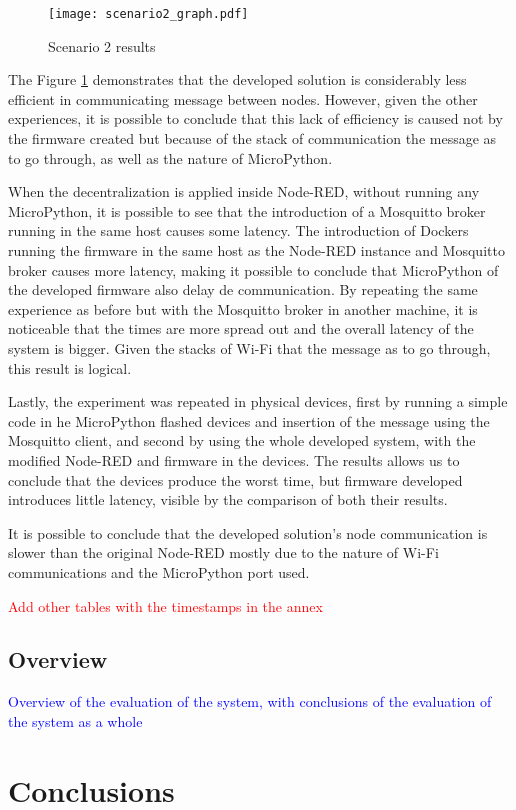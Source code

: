 \begin{figure}[h]
\centering
\texttt{[image: scenario2\_graph.pdf]}
\caption[Scenario 2 results]{Scenario 2 results}\label{fig:scenario2_candlestick}
\end{figure}

The Figure \ref{fig:scenario2_candlestick} demonstrates that the developed solution is considerably less efficient in communicating message between nodes. However, given the other experiences, it is possible to conclude that this lack of efficiency is caused not by the firmware created but because of the stack of communication the message as to go through, as well as the nature of MicroPython. 

When the decentralization is applied inside Node-RED, without running any MicroPython, it is possible to see that the introduction of a Mosquitto broker running in the same host causes some latency. The introduction of Dockers running the firmware in the same host as the Node-RED instance and Mosquitto broker causes more latency, making it possible to conclude that MicroPython of the developed firmware also delay de communication. By repeating the same experience as before but with the Mosquitto broker in another machine, it is noticeable that the times are more spread out and the overall latency of the system is bigger. Given the stacks of Wi-Fi that the message as to go through, this result is logical.

Lastly, the experiment was repeated in physical devices, first by running a simple code in he MicroPython flashed devices and insertion of the message using the Mosquitto client, and second by using the whole developed system, with the modified Node-RED and firmware in the devices. The results allows us to conclude that the devices produce the worst time, but firmware developed introduces little latency, visible by the comparison of both their results.

It is possible to conclude that the developed solution's node communication is slower than the original Node-RED mostly due to the nature of Wi-Fi communications and the MicroPython port used.   

\textcolor{red}{Add other tables with the timestamps in the annex}

\subsection{Overview}\label{sec:discussion_overview}

\textcolor{blue}{Overview of the evaluation of the system, with conclusions of the evaluation of the system as a whole}

\section{Conclusions}\label{sec:evaluation_conclusions}

